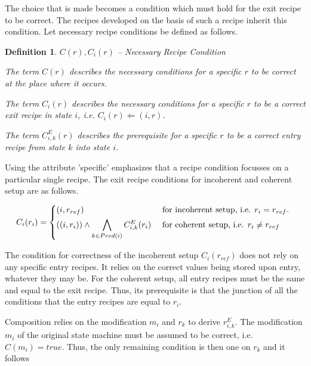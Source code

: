 \documentclass[12pt,a4paper]{scrartcl}
\newtheorem{definition}{Definition}
\begin{document}
The choice that is made becomes a condition which must hold for the exit recipe
to be correct. The recipes developed on the basis of such a recipe inherit this
condition. Let necessary recipe conditions be defined as follows.

\begin{definition} $C(r), C_i(r)$ -- Necessary Recipe Condition

    The term $C(r)$ describes the necessary conditions for a specific $r$ to be
    correct at the place where it occurs.

    The term $C_i(r)$ describes the necessary conditions for a specific $r$ to be a
    correct exit recipe in state $i$, i.e. $C_i(r) \Leftarrow (i, r)$. 

    The term $C^E_{i,k}(r)$ describes the prerequisite for a specific $r$ to be a
    correct entry recipe from state $k$ into state $i$.

\end{definition}

Using the attribute 'specific' emphasizes that a recipe condition focusses on a
particular single recipe. The exit recipe conditions for incoherent and
coherent setup are as follows.

\begin{equation} \label{eq:choices}
    C_i(r_i) = \begin{dcases*}
               (i, r_{ref}) \
                        & for incoherent setup, i.e. $r_i=r_{ref}$. \\
               \left( (i, r_i) \right) \wedge \bigwedge_{k\in Pred(i)} C^E_{i,k}(r_i) \
                        & for coherent setup, i.e. $r_i\neq r_{ref}$ 
             \end{dcases*}
\end{equation}

The condition for correctness of the incoherent setup $C_i(r_{ref})$ does not
rely on any specific entry recipes. It relies on the correct values being
stored upon entry, whatever they may be.  For the coherent setup, all entry
recipes must be the same and equal to the exit recipe. Thus, its prerequisite
is that the junction of all the conditions that the entry recipes are equal to
$r_i$.

Composition relies on the modification $m_i$ and $r_k$ to derive $r^E_{i,k}$. The
modification $m_i$ of the original state machine must be assumed to be correct,
i.e.  $C(m_i)=true$.  Thus, the only remaining condition is then one on $r_k$
and it follows
\end{document}
